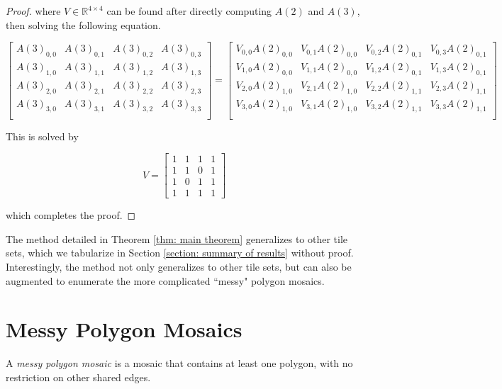 \documentclass[12pt]{article}
\theoremstyle{plain}
\theoremstyle{definition}
\theoremstyle{remark}
\theoremstyle{definition}
\begin{document}
\begin{proof}
where $V \in \mathbb{R}^{4 \times 4}$ can be found after directly computing $A(2)$ and $A(3)$, then solving the following equation.

$$
\begin{bmatrix}
    A(3)_{0,0} & A(3)_{0,1} & A(3)_{0,2} & A(3)_{0,3} \\
    A(3)_{1,0} & A(3)_{1,1} & A(3)_{1,2} & A(3)_{1,3} \\
    A(3)_{2,0} & A(3)_{2,1} & A(3)_{2,2} & A(3)_{2,3} \\
    A(3)_{3,0} & A(3)_{3,1} & A(3)_{3,2} & A(3)_{3,3} \\
\end{bmatrix} = 
\begin{bmatrix}
    V_{0,0}A(2)_{0,0} & V_{0,1}A(2)_{0,0} & V_{0,2}A(2)_{0,1} & V_{0,3}A(2)_{0,1} \\
    V_{1,0}A(2)_{0,0} & V_{1,1}A(2)_{0,0} & V_{1,2}A(2)_{0,1} & V_{1,3}A(2)_{0,1} \\
    V_{2,0}A(2)_{1,0} & V_{2,1}A(2)_{1,0} & V_{2,2}A(2)_{1,1} & V_{2,3}A(2)_{1,1} \\
    V_{3,0}A(2)_{1,0} & V_{3,1}A(2)_{1,0} & V_{3,2}A(2)_{1,1} & V_{3,3}A(2)_{1,1} \\
\end{bmatrix}
$$

This is solved by

$$V = 
\begin{bmatrix} 
    1 & 1 & 1 & 1 \\ 
    1 & 1 & 0 & 1 \\ 
    1 & 0 & 1 & 1 \\ 
    1 & 1 & 1 & 1 
\end{bmatrix}
$$


which completes the proof.

\end{proof}

The method detailed in Theorem \ref{thm: main theorem} generalizes to other tile sets, which we tabularize in Section \ref{section: summary of results} without proof. Interestingly, the method not only generalizes to other tile sets, but can also be augmented to enumerate the more complicated ``messy" polygon mosaics.

\section{Messy Polygon Mosaics}

A \textit{messy polygon mosaic} is a mosaic that contains at least one polygon, with no restriction on other shared edges. 
\end{document}
